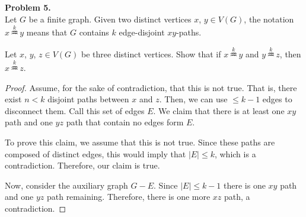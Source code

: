\documentclass{article}
\newenvironment{hwproof}[2]
{
    \textbf{Problem #1.}\\
    #2
    \begin{proof}
}{
    \end{proof}
    \newpage
}
\begin{document}
\begin{hwproof}
    {5}
    {Let $G$ be a finite graph. Given two distinct vertices $x$, $y \in V(G)$, the notation $x \,\overset{k}{\aquarius}\, y$ means that $G$ contains $k$ edge-disjoint $xy$-paths.

        \smallskip

        \noindent Let $x$, $y$, $z \in V(G)$ be three distinct vertices. Show that if $x \,\overset{k}{\aquarius}\, y$ and $y \,\overset{k}{\aquarius}\, z$, then $x \,\overset{k}{\aquarius}\, z$.}

    Assume, for the sake of contradiction, that this is not true. That is, there exist $n < k$ disjoint paths between $x$ and $z$. Then, we can use $\leq k - 1$
    edges to disconnect them. Call this set of edges $E$. We claim that there is at least one $xy$ path and one $yz$ path that contain no edges form $E$.

    To prove this claim, we assume that this is not true. Since these paths are composed of distinct edges, this would imply that $|E| \leq k$, which is a contradiction.
    Therefore, our claim is true.

    Now, consider the auxiliary graph $G - E$. Since $|E| \leq k - 1$ there is one $xy$ path and one $yz$ path remaining. Therefore, there is one more $xz$ path,
    a contradiction.
\end{hwproof}
\end{document}
